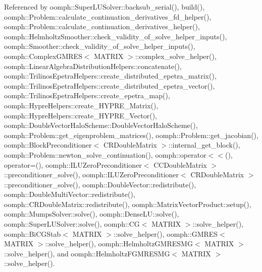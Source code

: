 Referenced by oomph\+::\+Super\+L\+U\+Solver\+::backsub\+\_\+serial(), build(), oomph\+::\+Problem\+::calculate\+\_\+continuation\+\_\+derivatives\+\_\+fd\+\_\+helper(), oomph\+::\+Problem\+::calculate\+\_\+continuation\+\_\+derivatives\+\_\+helper(), oomph\+::\+Helmholtz\+Smoother\+::check\+\_\+validity\+\_\+of\+\_\+solve\+\_\+helper\+\_\+inputs(), oomph\+::\+Smoother\+::check\+\_\+validity\+\_\+of\+\_\+solve\+\_\+helper\+\_\+inputs(), oomph\+::\+Complex\+G\+M\+R\+E\+S$<$ M\+A\+T\+R\+I\+X $>$\+::complex\+\_\+solve\+\_\+helper(), oomph\+::\+Linear\+Algebra\+Distribution\+Helpers\+::concatenate(), oomph\+::\+Trilinos\+Epetra\+Helpers\+::create\+\_\+distributed\+\_\+epetra\+\_\+matrix(), oomph\+::\+Trilinos\+Epetra\+Helpers\+::create\+\_\+distributed\+\_\+epetra\+\_\+vector(), oomph\+::\+Trilinos\+Epetra\+Helpers\+::create\+\_\+epetra\+\_\+map(), oomph\+::\+Hypre\+Helpers\+::create\+\_\+\+H\+Y\+P\+R\+E\+\_\+\+Matrix(), oomph\+::\+Hypre\+Helpers\+::create\+\_\+\+H\+Y\+P\+R\+E\+\_\+\+Vector(), oomph\+::\+Double\+Vector\+Halo\+Scheme\+::\+Double\+Vector\+Halo\+Scheme(), oomph\+::\+Problem\+::get\+\_\+eigenproblem\+\_\+matrices(), oomph\+::\+Problem\+::get\+\_\+jacobian(), oomph\+::\+Block\+Preconditioner$<$ C\+R\+Double\+Matrix $>$\+::internal\+\_\+get\+\_\+block(), oomph\+::\+Problem\+::newton\+\_\+solve\+\_\+continuation(), oomph\+::operator$<$$<$(), operator=(), oomph\+::\+I\+L\+U\+Zero\+Preconditioner$<$ C\+C\+Double\+Matrix $>$\+::preconditioner\+\_\+solve(), oomph\+::\+I\+L\+U\+Zero\+Preconditioner$<$ C\+R\+Double\+Matrix $>$\+::preconditioner\+\_\+solve(), oomph\+::\+Double\+Vector\+::redistribute(), oomph\+::\+Double\+Multi\+Vector\+::redistribute(), oomph\+::\+C\+R\+Double\+Matrix\+::redistribute(), oomph\+::\+Matrix\+Vector\+Product\+::setup(), oomph\+::\+Mumps\+Solver\+::solve(), oomph\+::\+Dense\+L\+U\+::solve(), oomph\+::\+Super\+L\+U\+Solver\+::solve(), oomph\+::\+C\+G$<$ M\+A\+T\+R\+I\+X $>$\+::solve\+\_\+helper(), oomph\+::\+Bi\+C\+G\+Stab$<$ M\+A\+T\+R\+I\+X $>$\+::solve\+\_\+helper(), oomph\+::\+G\+M\+R\+E\+S$<$ M\+A\+T\+R\+I\+X $>$\+::solve\+\_\+helper(), oomph\+::\+Helmholtz\+G\+M\+R\+E\+S\+M\+G$<$ M\+A\+T\+R\+I\+X $>$\+::solve\+\_\+helper(), and oomph\+::\+Helmholtz\+F\+G\+M\+R\+E\+S\+M\+G$<$ M\+A\+T\+R\+I\+X $>$\+::solve\+\_\+helper().

\mbox{\label{classoomph_1_1LinearAlgebraDistribution_a2634e540a78fe1ee3f5c907aff500b58}} 
